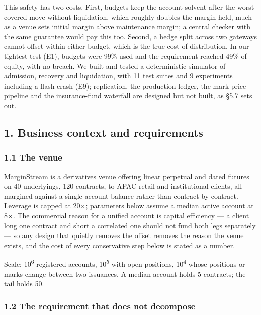 \documentclass[10pt,a4paper]{article}
\begin{document}
This safety has two costs. First, budgets keep the account solvent after the
worst covered move without liquidation, which roughly doubles the margin held,
much as a venue sets initial margin above maintenance margin; a central checker with
the same guarantee would pay this too. Second, a hedge split across two gateways
cannot offset within either budget, which is the true cost of distribution. In
our tightest test (E1), budgets were 99\% used and the requirement reached 49\% of
equity, with no breach. We built and tested a deterministic simulator of
admission, recovery and liquidation, with 11 test suites and 9 experiments
including a flash crash (E9); replication, the production ledger, the
mark-price pipeline and the insurance-fund waterfall are designed but not built,
as §5.7 sets out.



\label{start:1}%

\subsection{1. Business context and requirements}\label{business-context-and-requirements}

\subsubsection{1.1 The venue}\label{the-venue}

MarginStream is a derivatives venue offering linear perpetual and dated futures on
40 underlyings, 120 contracts, to APAC retail and institutional clients, all
margined against a single account balance rather than contract by contract.
Leverage is capped at 20×; parameters below assume a median active account at 8×.
The commercial reason for a unified account is capital efficiency --- a client long
one contract and short a correlated one should not fund both legs separately --- so
any design that quietly removes the offset removes the reason the venue exists,
and the cost of every conservative step below is stated as a number.

Scale: 10\textsuperscript{6} registered accounts, 10\textsuperscript{5} with open positions, 10\textsuperscript{4} whose positions or
marks change between two issuances. A median account holds 5 contracts; the tail
holds 50.

\subsubsection{1.2 The requirement that does not decompose}\label{the-requirement-that-does-not-decompose}
\end{document}
